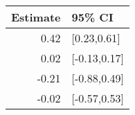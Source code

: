 \begin{tabular}{rl}
  \hline
Estimate & 95\% CI \\ 
  \hline
0.42 & [0.23,0.61] \\ 
  0.02 & [-0.13,0.17] \\ 
  -0.21 & [-0.88,0.49] \\ 
  -0.02 & [-0.57,0.53] \\ 
   \hline
\end{tabular}

